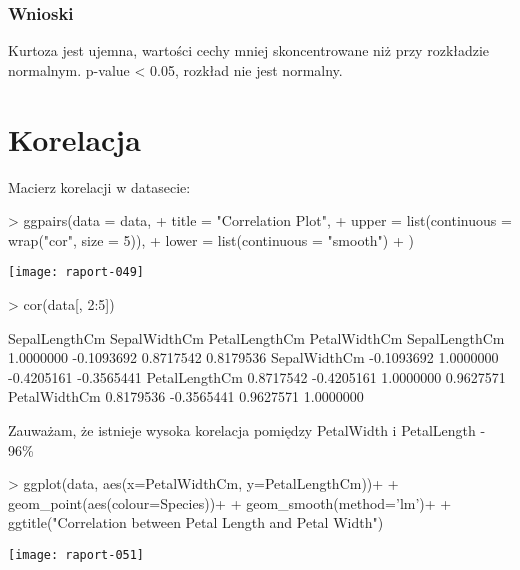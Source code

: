 \documentclass{article}
\begin{document}
\subsubsection{Wnioski}
Kurtoza jest ujemna, wartości cechy mniej skoncentrowane niż przy rozkładzie normalnym. p-value < 0.05, rozkład nie jest normalny.

\newpage

\section{Korelacja}
Macierz korelacji w datasecie:
\begin{Schunk}
\begin{Sinput}
> ggpairs(data = data,
+         title = "Correlation Plot",
+         upper = list(continuous = wrap("cor", size = 5)), 
+         lower = list(continuous = "smooth")
+ )
\end{Sinput}
\end{Schunk}
\texttt{[image: raport-049]}
\begin{Schunk}
\begin{Sinput}
> cor(data[, 2:5])
\end{Sinput}
\begin{Soutput}
              SepalLengthCm SepalWidthCm PetalLengthCm PetalWidthCm
SepalLengthCm     1.0000000   -0.1093692     0.8717542    0.8179536
SepalWidthCm     -0.1093692    1.0000000    -0.4205161   -0.3565441
PetalLengthCm     0.8717542   -0.4205161     1.0000000    0.9627571
PetalWidthCm      0.8179536   -0.3565441     0.9627571    1.0000000
\end{Soutput}
\end{Schunk}
\newpage
Zauważam, że istnieje wysoka korelacja pomiędzy PetalWidth i PetalLength - 96\%

\begin{Schunk}
\begin{Sinput}
> ggplot(data, aes(x=PetalWidthCm, y=PetalLengthCm))+
+   geom_point(aes(colour=Species))+
+   geom_smooth(method='lm')+
+   ggtitle("Correlation between Petal Length and Petal Width")
\end{Sinput}
\end{Schunk}
\texttt{[image: raport-051]}

\newpage
\end{document}
